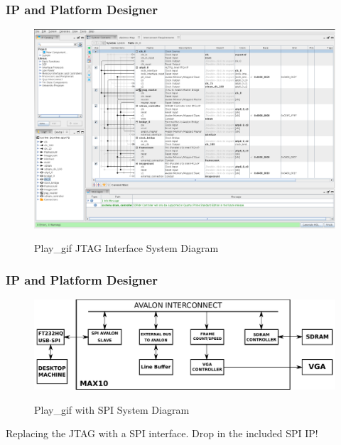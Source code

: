 \documentclass{beamer}
\begin{document}
\begin{frame}
\frametitle{IP and Platform Designer}

\begin{figure}[h]
	\centering
	\includegraphics[width=1.0\textwidth]{graphics/platform_designer.pdf}
	\centering\bfseries
	\caption{Play\_gif JTAG Interface System Diagram}
\end{figure}

\end{frame}

\begin{frame}
\frametitle{IP and Platform Designer}

\begin{figure}[h]
	\centering
	\includegraphics[width=1.0\textwidth]{graphics/spi_avalon_system}
	\centering\bfseries
	\caption{Play\_gif with SPI System Diagram}
\end{figure}

Replacing the JTAG with a SPI interface.  Drop in the included SPI IP!

\end{frame}
\end{document}
